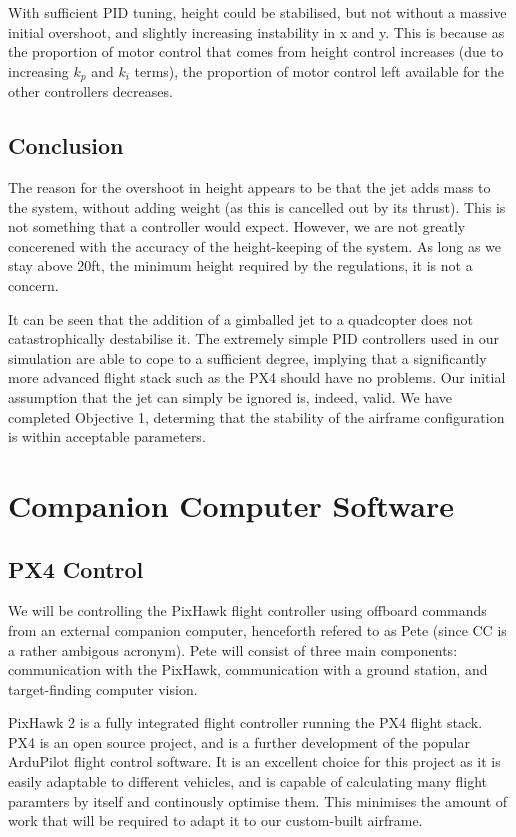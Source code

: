 \documentclass[11pt]{article}
\begin{document}
With sufficient PID tuning, height could be stabilised, but not without a massive initial overshoot, and slightly increasing instability in x and y. This is because as the proportion of motor control that comes from height control increases (due to increasing $k_p$ and $k_i$ terms), the proportion of motor control left available for the other controllers decreases.

\subsection{Conclusion}
The reason for the overshoot in height appears to be that the jet adds mass to the system, without adding weight (as this is cancelled out by its thrust). This is not something that a controller would expect. However, we are not greatly concerened with the accuracy of the height-keeping of the system. As long as we stay above 20ft, the minimum height required by the regulations\cite{IMechE_rules}, it is not a concern.

It can be seen that the addition of a gimballed jet to a quadcopter does not catastrophically destabilise it. The extremely simple PID controllers used in our simulation are able to cope to a sufficient degree, implying that a significantly more advanced flight stack such as the PX4 should have no problems. Our initial assumption that the jet can simply be ignored is, indeed, valid. We have completed Objective 1, determing that the stability of the airframe configuration is within acceptable parameters.



\section{Companion Computer Software}
\subsection{PX4 Control} \label{PX4 Control}
We will be controlling the PixHawk flight controller using offboard commands from an external companion computer, henceforth refered to as Pete (since CC is a rather ambigous acronym). Pete will consist of three main components: communication with the PixHawk, communication with a ground station, and target-finding computer vision.

PixHawk 2 is a fully integrated flight controller running the PX4 flight stack. PX4 is an open source project, and is a further development of the popular ArduPilot flight control software. It is an excellent choice for this project as it is easily adaptable to different vehicles, and is capable of calculating many flight paramters by itself and continously optimise them. This minimises the amount of work that will be required to adapt it to our custom-built airframe.
\end{document}
